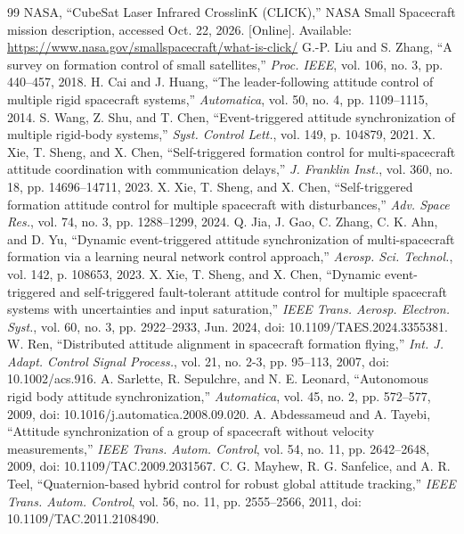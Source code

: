 \documentclass[journal]{IEEEtran}
\begin{document}
\begin{thebibliography}{99}
 NASA, ``CubeSat Laser Infrared CrosslinK (CLICK),'' NASA Small Spacecraft mission description, accessed Oct. 22, 2026. [Online]. Available: \url{https://www.nasa.gov/smallspacecraft/what-is-click/}
 G.-P. Liu and S. Zhang, ``A survey on formation control of small satellites,'' \emph{Proc. IEEE}, vol. 106, no. 3, pp. 440--457, 2018.
 H. Cai and J. Huang, ``The leader-following attitude control of multiple rigid spacecraft systems,'' \emph{Automatica}, vol. 50, no. 4, pp. 1109--1115, 2014.
 S. Wang, Z. Shu, and T. Chen, ``Event-triggered attitude synchronization of multiple rigid-body systems,'' \emph{Syst. Control Lett.}, vol. 149, p. 104879, 2021.
 X. Xie, T. Sheng, and X. Chen, ``Self-triggered formation control for multi-spacecraft attitude coordination with communication delays,'' \emph{J. Franklin Inst.}, vol. 360, no. 18, pp. 14696--14711, 2023.
 X. Xie, T. Sheng, and X. Chen, ``Self-triggered formation attitude control for multiple spacecraft with disturbances,'' \emph{Adv. Space Res.}, vol. 74, no. 3, pp. 1288--1299, 2024.
 Q. Jia, J. Gao, C. Zhang, C. K. Ahn, and D. Yu, ``Dynamic event-triggered attitude synchronization of multi-spacecraft formation via a learning neural network control approach,'' \emph{Aerosp. Sci. Technol.}, vol. 142, p. 108653, 2023.
 X. Xie, T. Sheng, and X. Chen, ``Dynamic event-triggered and self-triggered fault-tolerant attitude control for multiple spacecraft systems with uncertainties and input saturation,'' \emph{IEEE Trans. Aerosp. Electron. Syst.}, vol. 60, no. 3, pp. 2922--2933, Jun. 2024, doi: 10.1109/TAES.2024.3355381.
 W. Ren, ``Distributed attitude alignment in spacecraft formation flying,'' \emph{Int. J. Adapt. Control Signal Process.}, vol. 21, no. 2-3, pp. 95--113, 2007, doi: 10.1002/acs.916.
 A. Sarlette, R. Sepulchre, and N. E. Leonard, ``Autonomous rigid body attitude synchronization,'' \emph{Automatica}, vol. 45, no. 2, pp. 572--577, 2009, doi: 10.1016/j.automatica.2008.09.020.
 A. Abdessameud and A. Tayebi, ``Attitude synchronization of a group of spacecraft without velocity measurements,'' \emph{IEEE Trans. Autom. Control}, vol. 54, no. 11, pp. 2642--2648, 2009, doi: 10.1109/TAC.2009.2031567.
 C. G. Mayhew, R. G. Sanfelice, and A. R. Teel, ``Quaternion-based hybrid control for robust global attitude tracking,'' \emph{IEEE Trans. Autom. Control}, vol. 56, no. 11, pp. 2555--2566, 2011, doi: 10.1109/TAC.2011.2108490.

\end{thebibliography}
\end{document}
